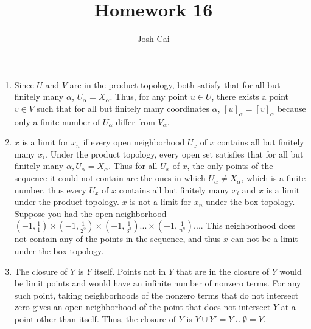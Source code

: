 \documentclass{article}
\begin{document}
\title{Homework 16}
\author{Josh Cai}

\maketitle
\begin{enumerate}
\item
Since $U$ and $V$ are in the product topology, both satisfy that for all but finitely many $\alpha$, $U_{\alpha} = X_{\alpha}$. Thus, for any point $u \in U$, there exists a point $v \in V$ such that for all but finitely many coordinates $\alpha$, $[u]_{\alpha} = [v]_{\alpha}$ because only a finite number of $U_{\alpha}$ differ from $V_{\alpha}$.

\item
$x$ is a limit for $x_n$ if every open neighborhood $U_x$ of $x$ contains all but finitely many $x_i$. Under the product topology, every open set satisfies that for all but finitely many $\alpha, U_{\alpha} = X_{\alpha}$. Thus for all $U_x$ of $x$, the only points of the sequence it could not contain are the ones in which $U_{\alpha} \neq X_{\alpha}$, which is a finite number, thus every $U_x$ of $x$ contains all but finitely many $x_i$ and $x$ is a limit under the product topology. $x$ is not a limit for $x_n$ under the box topology. Suppose you had the open neighborhood $(-1,\frac{1}{1})\times (-1,\frac{1}{2^2}) \times (-1,\frac{1}{3^3})... \times (-1,\frac{1}{n^n})...$. This neighborhood does not contain any of the points in the sequence, and thus $x$ can not be a limit under the box topology.
\addtocounter{enumi}{1}
\item
The closure of $Y$ is $Y$ itself. Points not in $Y$ that are in the closure of $Y$ would be limit points and would have an infinite number of nonzero terms. For any such point, taking neighborhoods of the nonzero terms that do not intersect zero gives an open neighborhood of the point that does not intersect $Y$ at a point other than itself. Thus, the closure of $Y$ is $Y \cup Y' = Y \cup \emptyset = Y$.

\end{enumerate}
\end{document}
